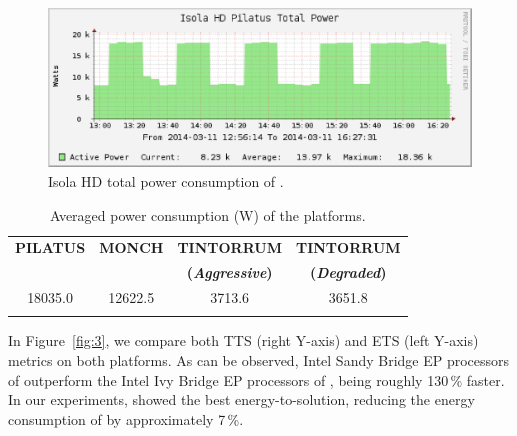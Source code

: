 \begin{figure}[ht]
  \centering
  \includegraphics[width=1\columnwidth]{Figs/NRJ_benchmark_Pilatus.eps}
  \caption{Isola HD total power consumption of \pilat.}
  \label{fig:2}
\end{figure}

\begin{table}[ht]
  \centering
  \caption{Averaged power consumption (W) of the platforms.}
  \label{tab:1}
  \begin{tabular}{cccc}
    \hline\noalign{\smallskip}     \textbf{\scriptsize{PILATUS}}     &
    \textbf{\scriptsize{MONCH}}  &  \textbf{\scriptsize{TINTORRUM}}  &
    \textbf{\scriptsize{TINTORRUM}}           \\          &          &
    \textbf{\scriptsize{(\emph{Aggressive})}} & \textbf{\scriptsize{(\emph{Degraded})}}
    \\    \noalign{\smallskip}\hline\noalign{\smallskip}   18035.0   &
    12622.5 & 3713.6 & 3651.8 \\ \noalign{\smallskip}\hline
  \end{tabular}
\end{table}

In  Figure~\ref{fig:3}, we  compare both  TTS (right  Y-axis)  and ETS
(left Y-axis)  metrics on both  platforms.  As can be  observed, Intel
Sandy Bridge EP  processors of \pilat outperform the  Intel Ivy Bridge
EP processors of \monch, being roughly 130\,\% faster.
In  our  experiments,   \monch  showed  the  best  energy-to-solution,
reducing the energy consumption of \pilat by approximately 7\,\%.


